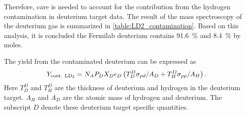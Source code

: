 \documentclass[../main.tex]{subfiles}
\begin{document}
Therefore, care is needed to account for the contribution from the hydrogen contamination in deuterium
target data. The result of the mass spectroscopy of the deuterium gas \cite{don-4993} is
summarized in \cref{table:LD2_contamination}. Based on this analysis, it is concluded the Fermilab
deuterium contains \SI{91.6}{\percent}  and \SI{8.4}{\percent}  by moles. 

The yield from the contaminated deuterium can be expressed as
\begin{equation}
	Y_{\mathrm{cont.~\ce{LD_2}}} = N_A P_D X_D \epsilon_D \left( T_D^D \sigma_{pd}/A_D + T^D_H \sigma_{pp}/A_H   \right).
\end{equation}
Here $T_D^D$ and $T^D_H$ are the thickness of deuterium and hydrogen in the deuterium target.
$A_H$ and $A_D$ are the atomic mass of hydrogen and deuterium.
The subscript $D$ denote these deuterium target specific quantities.
\end{document}
